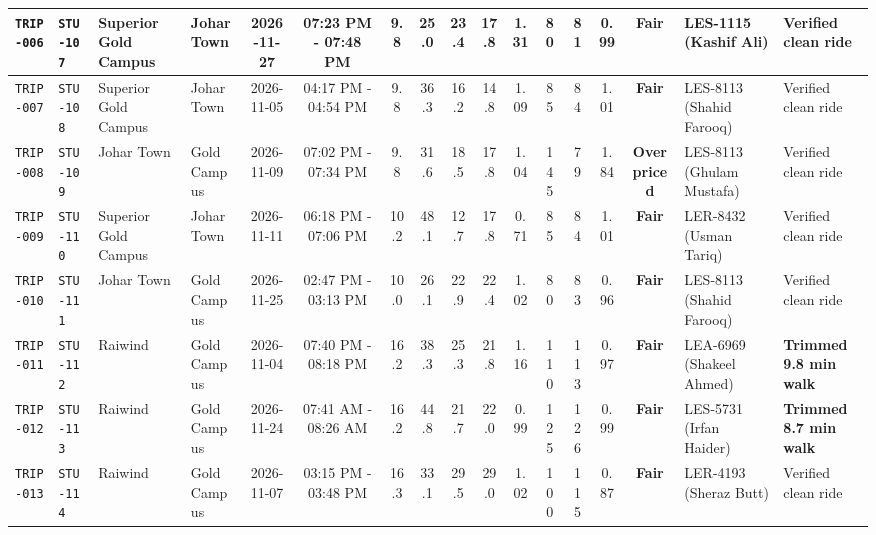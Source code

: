 \documentclass[9pt, a4paper, landscape]{article}
\begin{document}
\begin{table}[h!]
\begin{tabularx}{\textwidth}{|l|l|p{2.2cm}|p{2.3cm}|c|c|c|c|c|c|c|c|c|c|c|p{3.1cm}|X|}
\rowcolor{lightgray}\texttt{TRIP-006} & \texttt{STU-107} & Superior Gold Campus & Johar Town & 2026-11-27 & 07:23 PM - 07:48 PM & 9.8 & 25.0 & 23.4 & 17.8 & 1.31 & 80 & 81 & 0.99 & \textcolor{accentteal}{\textbf{Fair}} & LES-1115 (Kashif Ali) & \textcolor{slate}{Verified clean ride} \\ \hline
\rowcolor{white}\texttt{TRIP-007} & \texttt{STU-108} & Superior Gold Campus & Johar Town & 2026-11-05 & 04:17 PM - 04:54 PM & 9.8 & 36.3 & 16.2 & 14.8 & 1.09 & 85 & 84 & 1.01 & \textcolor{accentteal}{\textbf{Fair}} & LES-8113 (Shahid Farooq) & \textcolor{slate}{Verified clean ride} \\ \hline
\rowcolor{lightgray}\texttt{TRIP-008} & \texttt{STU-109} & Johar Town & Gold Campus & 2026-11-09 & 07:02 PM - 07:34 PM & 9.8 & 31.6 & 18.5 & 17.8 & 1.04 & 145 & 79 & 1.84 & \textcolor{accentred}{\textbf{Overpriced}} & LES-8113 (Ghulam Mustafa) & \textcolor{slate}{Verified clean ride} \\ \hline
\rowcolor{white}\texttt{TRIP-009} & \texttt{STU-110} & Superior Gold Campus & Johar Town & 2026-11-11 & 06:18 PM - 07:06 PM & 10.2 & 48.1 & 12.7 & 17.8 & 0.71 & 85 & 84 & 1.01 & \textcolor{accentteal}{\textbf{Fair}} & LER-8432 (Usman Tariq) & \textcolor{slate}{Verified clean ride} \\ \hline
\rowcolor{lightgray}\texttt{TRIP-010} & \texttt{STU-111} & Johar Town & Gold Campus & 2026-11-25 & 02:47 PM - 03:13 PM & 10.0 & 26.1 & 22.9 & 22.4 & 1.02 & 80 & 83 & 0.96 & \textcolor{accentteal}{\textbf{Fair}} & LES-8113 (Shahid Farooq) & \textcolor{slate}{Verified clean ride} \\ \hline
\rowcolor{white}\texttt{TRIP-011} & \texttt{STU-112} & Raiwind & Gold Campus & 2026-11-04 & 07:40 PM - 08:18 PM & 16.2 & 38.3 & 25.3 & 21.8 & 1.16 & 110 & 113 & 0.97 & \textcolor{accentteal}{\textbf{Fair}} & LEA-6969 (Shakeel Ahmed) & \textcolor{accentblue}{\textbf{Trimmed 9.8 min walk}} \\ \hline
\rowcolor{lightgray}\texttt{TRIP-012} & \texttt{STU-113} & Raiwind & Gold Campus & 2026-11-24 & 07:41 AM - 08:26 AM & 16.2 & 44.8 & 21.7 & 22.0 & 0.99 & 125 & 126 & 0.99 & \textcolor{accentteal}{\textbf{Fair}} & LES-5731 (Irfan Haider) & \textcolor{accentblue}{\textbf{Trimmed 8.7 min walk}} \\ \hline
\rowcolor{white}\texttt{TRIP-013} & \texttt{STU-114} & Raiwind & Gold Campus & 2026-11-07 & 03:15 PM - 03:48 PM & 16.3 & 33.1 & 29.5 & 29.0 & 1.02 & 100 & 115 & 0.87 & \textcolor{accentteal}{\textbf{Fair}} & LER-4193 (Sheraz Butt) & \textcolor{slate}{Verified clean ride} \\ \hline

\end{tabularx}
\end{table}
\end{document}
